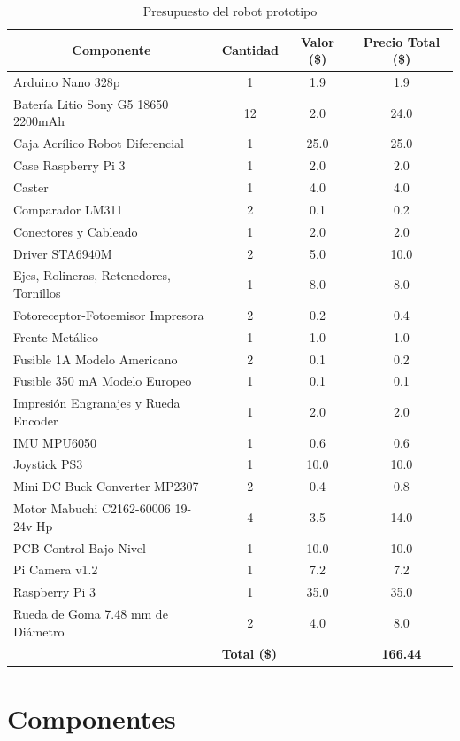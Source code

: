 \begin{table}[htbp]
	\caption{Presupuesto del robot prototipo}
	\begin{tabular}{|l|c|c|c|}
		\hline
		\multicolumn{1}{|c|}{\textbf{Componente}} & \textbf{Cantidad} & \textbf{Valor (\$)} & \textbf{Precio Total (\$)} \\ \hline
		Arduino Nano 328p & 1 & 1.9 & 1.9 \\ \hline
		Batería Litio Sony G5 18650  2200mAh  & 12 & 2.0 & 24.0 \\ \hline
		Caja Acrílico Robot Diferencial & 1 & 25.0 & 25.0 \\ \hline
		Case Raspberry Pi 3 & 1 & 2.0 & 2.0 \\ \hline
		Caster & 1 & 4.0 & 4.0 \\ \hline
		Comparador LM311 & 2 & 0.1 & 0.2 \\ \hline
		Conectores y Cableado & 1 & 2.0 & 2.0 \\ \hline
		Driver STA6940M & 2 & 5.0 & 10.0 \\ \hline
		Ejes, Rolineras, Retenedores, Tornillos & 1 & 8.0 & 8.0 \\ \hline
		Fotoreceptor-Fotoemisor Impresora & 2 & 0.2 & 0.4 \\ \hline
		Frente Metálico & 1 & 1.0 & 1.0 \\ \hline
		Fusible 1A  Modelo  Americano & 2 & 0.1 & 0.2 \\ \hline
		Fusible 350 mA Modelo Europeo & 1 & 0.1 & 0.1 \\ \hline
		Impresión Engranajes y Rueda Encoder & 1 & 2.0 & 2.0 \\ \hline
		IMU MPU6050 & 1 & 0.6 & 0.6 \\ \hline
		Joystick PS3 & 1 & 10.0 & 10.0 \\ \hline
		Mini DC Buck Converter MP2307 & 2 & 0.4 & 0.8 \\ \hline
		Motor Mabuchi C2162-60006 19-24v Hp & 4 & 3.5 & 14.0 \\ \hline
		PCB Control Bajo Nivel & 1 & 10.0 & 10.0 \\ \hline
		Pi Camera  v1.2 & 1 & 7.2 & 7.2 \\ \hline
		Raspberry Pi 3 & 1 & 35.0 & 35.0 \\ \hline
		Rueda de Goma 7.48 mm de Diámetro & 2 & 4.0 & 8.0 \\ \hline
		& \multicolumn{1}{l|}{\textbf{Total (\$)}} & \multicolumn{1}{l|}{} & \textbf{166.44} \\ \hline
	\end{tabular}
	\label{PresupuestoRobot}
\end{table}



\section{Componentes}





